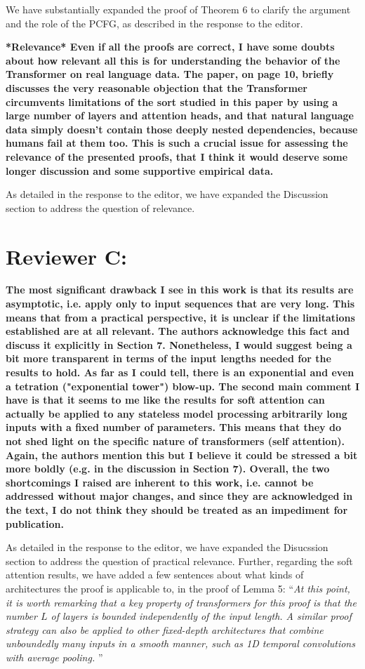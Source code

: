 \documentclass[11pt,a4paper]{article}
\newcommand\response[1]{{\color{blue}#1}}
\newcommand\newtext[1]{``\textit{#1}''}
\newcommand\original[1]{\textbf{#1}}
\begin{document}
\response{We have substantially expanded the proof of Theorem 6 to clarify the argument and the role of the PCFG, as described in the response to the editor.}

\original{*Relevance*
Even if all the proofs are correct, I have some doubts about how relevant
all this is for understanding the behavior of the Transformer on real
language data. The paper, on page 10, briefly discusses the very reasonable
objection that the Transformer circumvents limitations of the sort studied
in this paper by using a large number of layers and attention heads, and
that natural language data simply doesn’t contain those deeply nested
dependencies, because humans fail at them too. This is such a crucial issue
for assessing the relevance of the presented proofs, that I think it would
deserve some longer discussion and some supportive empirical data.}

\response{As detailed in the response to the editor, we have expanded the Discussion section to address the question of relevance.}


\section{Reviewer C:}

\original{The most significant drawback I see in this work is that its results are
asymptotic, i.e. apply only to input sequences that are very long.  This
means that from a practical perspective, it is unclear if the limitations
established are at all relevant.  The authors acknowledge this fact and
discuss it explicitly in Section 7.  Nonetheless, I would suggest being a
bit more transparent in terms of the input lengths needed for the results to
hold.  As far as I could tell, there is an exponential and even a tetration
("exponential tower") blow-up.  The second main comment I have is that it
seems to me like the results for soft attention can actually be applied to
any stateless model processing arbitrarily long inputs with a fixed number
of parameters.  This means that they do not shed light on the specific
nature of transformers (self attention).  Again, the authors mention this
but I believe it could be stressed a bit more boldly (e.g. in the discussion
in Section 7).  Overall, the two shortcomings I raised are inherent to this
work, i.e. cannot be addressed without major changes, and since they are
acknowledged in the text, I do not think they should be treated as an
impediment for publication.}

\response{As detailed in the response to the editor, we have expanded the Disucssion section to address the question of practical relevance. Further, regarding the soft attention results, we have added a few sentences about what kinds of architectures the proof is applicable to, in the proof of Lemma 5: \newtext{At this point, it is worth remarking that a key property of transformers for this proof is that the number $L$ of layers is bounded independently of the input length.
A similar proof strategy can also be applied to other fixed-depth architectures that combine unboundedly many inputs in a smooth manner, such as 1D temporal convolutions with average pooling.
}}
\end{document}
